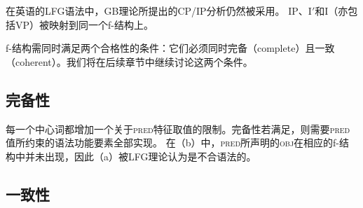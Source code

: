 \noindent
在英语的LFG语法中，GB理论所提出的CP/IP分析仍然被采用。
IP、I$'$和I（亦包括VP）被映射到同一个f-结构上。

\eal
{}

%
\hspace*{4em}%
{}
\zl




\noindent
f-结构需同时满足两个合格性的条件：它们必须同时完备（complete）且一致（coherent）。我们将在后续章节中继续讨论这两个条件。

\subsection{完备性}

每一个中心词都增加一个关于\textsc{pred}特征取值的限制。完备性若满足，则需要\textsc{pred}值所约束的语法功能要素全部实现。
在（b）中，\textsc{pred}所声明的\textsc{obj}在相应的f-结构中并未出现，因此（a）被LFG理论认为是不合语法的。

\eal
{}
\zl

\subsection{一致性}

